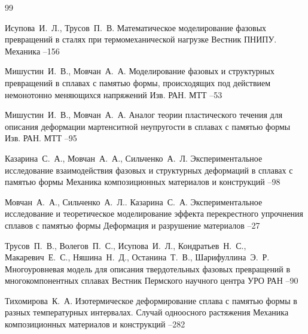 
\begin{thebibliography}{99}

\by Исупова~И.~Л., Трусов~П.~В.
\paper Математическое моделирование фазовых превращений в сталях при термомеханической нагрузке
\jour Вестник ПНИПУ. Механика
--156

\by Мишустин~И.~В., Мовчан~А.~А.
\paper Моделирование фазовых и структурных превращений в сплавах с памятью формы, происходящих под действием немонотонно меняющихся напряжений
\jour Изв. РАН. МТТ
--53


\by Мишустин~И.~В., Мовчан~А.~А.
\paper Аналог теории пластического течения для описания деформации мартенситной неупругости в сплавах с памятью формы
\jour Изв. РАН. МТТ
--95


\by Казарина~С.~А., Мовчан~А.~А., Сильченко~А.~Л.
\paper Экспериментальное исследование взаимодействия фазовых и структурных деформаций в сплавах с памятью формы
\jour Механика композиционных материалов и конструкций
--98

\by Мовчан~А.~А., Сильченко~А.~Л.. Казарина~С.~А.
\paper Экспериментальное исследование и теоретическое моделирование эффекта перекрестного упрочнения сплавов с памятью формы
\jour Деформация и разрушение материалов
--27

\by Трусов~П.~В., Волегов~П.~С., Исупова~И.~Л., Кондратьев~Н.~С., Макаревич~Е.~С., Няшина~Н.~Д., Останина~Т.~В., Шарифуллина~Э.~Р.
\paper Многоуровневая модель для описания твердотельных фазовых превращений в многокомпонентных сплавах
\jour Вестник Пермского научного центра УРО РАН
--90

\by Тихомирова~К.~А.
\paper Изотермическое деформирование сплава с памятью формы в разных температурных интервалах. Случай одноосного растяжения
\jour Механика композиционных материалов и конструкций
--282


\end{thebibliography}
